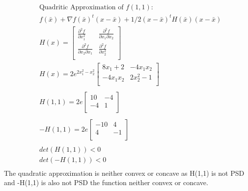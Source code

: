 \documentclass[12pt]{article}
\begin{document}
    \begin{align*}
        &\text{Quadritic Approximation of } f(1,1): \\ 
        &f(\bar x) + \nabla f(\bar x)^t (x-\bar x) + 1/2 (x-\bar x)^t H(\bar x) (x-\bar x)\\ 
        &H(x) = 
        \begin{bmatrix}
          \frac{\partial^2 f}{\partial x_1^2} & \frac{\partial^2 f}{\partial x_1 \partial x_2} \\
          \frac{\partial^2 f}{\partial x_2 \partial x_1} & \frac{\partial^2 f}{\partial x_2^2} \\
        \end{bmatrix} \\
        &H(x) = 2e^{2x_1^2 -x_2^2}
        \begin{bmatrix}
            8x_1 + 2 & -4x_1x_2\\
            -4x_1x_2 & 2x_2^2-1\\
        \end{bmatrix} \\ \\
         &H(1,1) = 2e
        \begin{bmatrix}
            10 & -4\\
            -4 & 1\\
        \end{bmatrix} \\ \\
         &-H(1,1) = 2e
        \begin{bmatrix}
            -10 & 4\\
            4 & -1\\
        \end{bmatrix} \\ \\
        & det(H(1,1)) < 0\\
        & det(-H(1,1)) < 0 \\
    \end{align*}
The quadratic approximation is neither convex or concave as H(1,1) is not PSD and -H(1,1) is also not PSD the function neither convex or concave.
\end{document}
